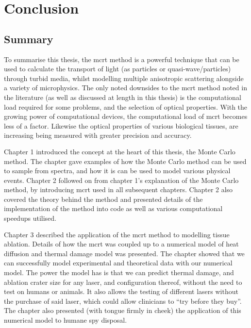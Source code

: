 \chapter{Conclusion}

\section{Summary}

To summarise this thesis, the \gls*{mcrt} method is a powerful technique that can be used to calculate the transport of light (as particles or quasi-wave/particles) through turbid media, whilst modelling multiple anisotropic scattering alongside a variety of microphysics.
The only noted downsides to the \gls*{mcrt} method noted in the literature (as well as discussed at length in this thesis) is the computational load required for some problems, and the selection of optical properties.
With the growing power of computational devices, the computational load of \gls*{mcrt} becomes less of a factor.
Likewise the optical properties of various biological tissues, are increasing being measured with greater precision and accuracy.

\medskip

Chapter 1 introduced the concept at the heart of this thesis, the Monte Carlo method.
The chapter gave examples of how the Monte Carlo method can be used to sample from spectra, and how it is can be used to model various physical events.
Chapter 2 followed on from chapter 1's explanation of the Monte Carlo method, by introducing \gls*{mcrt} used in all subsequent chapters.
Chapter 2 also covered the theory behind the method and presented details of the implementation of the method into code as well as various computational speedups utilised.

\medskip

Chapter 3 described the application of the \gls*{mcrt} method to modelling tissue ablation.
Details of how the \gls*{mcrt} was coupled up to a numerical model of heat diffusion and thermal damage model was presented.
The chapter showed that we can successfully model experimental and theoretical data with our numerical model.
The power the model has is that we can predict thermal damage, and ablation crater size for any laser, and configuration thereof, without the need to test on humans or animals.
It also allows the testing of different lasers without the purchase of said laser, which could allow clinicians to ``try before they buy''.
The chapter also presented (with tongue firmly in cheek) the application of this numerical model to humane spy disposal.

